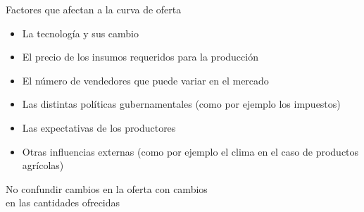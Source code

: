 \documentclass{beamer}
\begin{document}
\begin{frame}{Factores que afectan a la curva de oferta}
    \begin{itemize}
        \item La tecnología y sus cambio
        \item El precio de los insumos requeridos para la producción
        \item El número de vendedores que puede variar en el mercado
        \item Las distintas políticas gubernamentales (como por ejemplo los impuestos)
        \item Las expectativas de los productores
        \item Otras influencias externas (como por ejemplo el clima en el caso de productos agrícolas)  
    \end{itemize}
    \begin{boxB}
        \begin{center}
          No confundir cambios en la oferta con cambios \\ en las cantidades ofrecidas
        \end{center}
    \end{boxB}
\end{frame}




\end{document}
